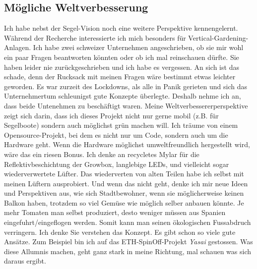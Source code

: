 \documentclass[12pt,titlepage,a4paper]{article}
\begin{document}
\subsection{Mögliche Weltverbesserung}
Ich habe nebst der Segel-Vision noch eine weitere Perspektive kennengelernt. Während der Recherche interessierte ich mich besonders für Vertical-Gardening-Anlagen. Ich habe zwei schweizer Unternehmen angeschrieben, ob sie mir wohl ein paar Fragen beantworten könnten oder ob ich mal reinschauen dürfte. Sie haben leider nie zurückgeschrieben und ich habe es vergessen. An sich ist das schade, denn der Rucksack mit meinen Fragen wäre bestimmt etwas leichter geworden. Es war zurzeit des Lockdowns, als alle in Panik gerieten und sich das Unternehmertum schleunigst gute Konzepte überlegte. Deshalb nehme ich an, dass beide Untenehmen zu beschäftigt waren. Meine Weltverbessererperspektive zeigt sich darin, dass ich dieses Projekt nicht nur gerne mobil (z.B. für Segelboote) sondern auch möglichst grün machen will. Ich träume von einem Opensource-Projekt, bei dem es nicht nur um Code, sondern auch um die Hardware geht. Wenn die Hardware möglichst umweltfreundlich hergestellt wird, wäre das ein riesen Bonus. Ich denke an recycletes Mylar für die Reflektivbeschichtung der Growbox, langlebige LEDs, und vielleicht sogar wiederverwertete Lüfter. Das wiederverten von alten Teilen habe ich selbst mit meinen Lüftern ausprobiert. Und wenn das nicht geht, denke ich mir neue Ideen und Perspektiven aus, wie sich Stadtbewohner, wenn sie möglicherweise keinen Balkon haben, trotzdem so viel Gemüse wie möglich selber anbauen könnte. Je mehr Tomaten man selbst produziert, desto weniger müssen aus Spanien eingefuhrt/eingeflogen werden. Somit kann man seinen ökologischen Fussabdruch verringern. Ich denke Sie verstehen das Konzept. Es gibt schon so viele gute Ansätze. Zum Beispiel bin ich auf das ETH-SpinOff-Projekt \textit{Yasai} gestossen. Was diese Allumnis machen, geht ganz stark in meine Richtung, mal schauen was sich daraus ergibt.
\end{document}

